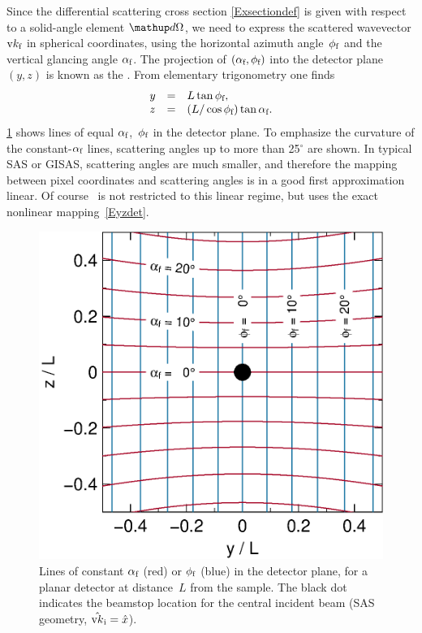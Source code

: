 Since the differential scattering cross section \cref{Exsectiondef}
is given with respect to a solid-angle element $\d\Omega$,
we need to express the scattered wavevector $\k_\sf$ in spherical coordinates,
using the horizontal azimuth angle~$\phi_\sf$
and the vertical glancing angle $\alpha_\sf$.
The projection of $(\alpha_\sf,\phi_\sf)$ into
the detector plane~$(y,z)$ is known as the .
%
%
%
%
From elementary trigonometry one finds
\begin{equation}\label{Eyzdet}
  \begin{array}{lcl}
  y &=& L \tan\phi_\sf,\\
  z &=& (L/ \cos\phi_\sf) \tan\alpha_\sf.
  \end{array}
\end{equation}
\cref{Fconstalphi} shows lines of equal $\alpha_\sf$,~$\phi_\sf$
in the detector plane.
To emphasize the curvature of the constant-$\alpha_\sf$ lines,
scattering angles up to more than 25$^\circ$ are shown.
In typical SAS or GISAS,
scattering angles are much smaller,
and therefore the mapping between pixel coordinates and
scattering angles is in a good first approximation linear.
Of course \BornAgain\ is not restricted to this linear regime,
but uses the exact nonlinear mapping~\cref{Eyzdet}.

\begin{figure}[t]
\begin{center}
\includegraphics[width=.47\textwidth]{fig/drawing/SAS_const_alphi.ps}
\end{center}
\caption{Lines of constant $\alpha_\sf$ (red) or $\phi_\sf$ (blue)
in the detector plane,
for a planar detector at distance~$L$ from the sample.
The black dot indicates the beamstop location for
the central incident beam (SAS geometry, $\hat\k_\si = \hat x$).}
\label{Fconstalphi}
\end{figure}

